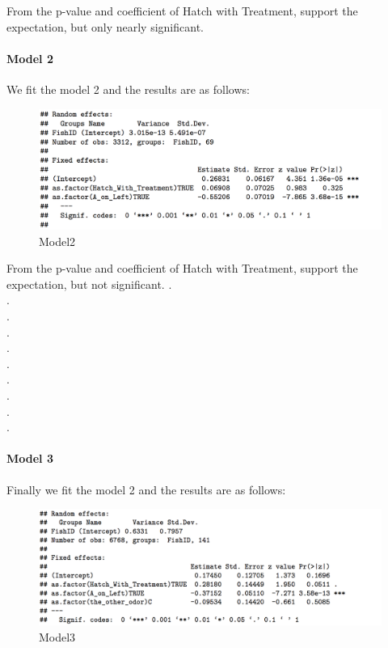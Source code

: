 \documentclass{article}
\begin{document}
	From the p-value and coefficient of Hatch with Treatment, support the expectation, but only nearly significant.
	
	\paragraph{Model 2}
	We fit the model 2 and the results are as follows:
	\begin{figure}[h]
		\centering
		\includegraphics[width=1\textwidth]{Salmonmodel2}
		\caption{Model2}		
	\end{figure}
	
	From the p-value and coefficient of Hatch with Treatment, support the expectation, but not significant.
	.\\
	.\\
	.\\
	.\\
	.\\
	.\\
	.\\
	.\\
	.\\
	.\\

	\paragraph{Model 3}
	Finally we fit the model 2 and the results are as follows:
	
	\begin{figure}[h]
		\centering
		\includegraphics[width=1\textwidth]{Salmonmodel3}
		\caption{Model3}
	\end{figure}
	
\end{document}
